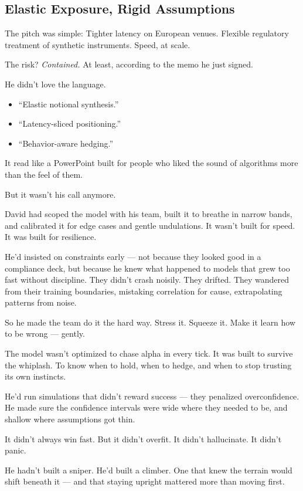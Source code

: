 
\subsection{Elastic Exposure, Rigid Assumptions}

The pitch was simple:
Tighter latency on European venues.
Flexible regulatory treatment of synthetic instruments.
Speed, at scale.

The risk?
\textit{Contained.} At least, according to the memo he just signed.

He didn’t love the language.

\begin{itemize}
    \item ``Elastic notional synthesis.'' 
    \item ``Latency-sliced positioning.'' 
    \item ``Behavior-aware hedging.''
\end{itemize}

It read like a PowerPoint built for people who liked the sound of algorithms more than the 
feel of them.

But it wasn’t his call anymore.

David had scoped the model with his team, built it to breathe in narrow bands, and calibrated it for edge 
cases and gentle undulations.
It wasn’t built for speed.
It was built for resilience.

He’d insisted on constraints early — not because they looked good in a compliance deck, but because 
he knew what happened to models that grew too fast without discipline. They didn’t crash noisily. 
They drifted. They wandered from their training boundaries, mistaking correlation for cause, 
extrapolating patterns from noise.

So he made the team do it the hard way.
Stress it. Squeeze it. Make it learn how to be wrong — gently.

The model wasn’t optimized to chase alpha in every tick.
It was built to survive the whiplash.
To know when to hold, when to hedge, and when to stop trusting its own instincts.

He’d run simulations that didn’t reward success — they penalized overconfidence.
He made sure the confidence intervals were wide where they needed to be, and shallow where assumptions 
got thin.

It didn’t always win fast.
But it didn’t overfit. It didn’t hallucinate. It didn’t panic.

He hadn’t built a sniper.
He’d built a climber. One that knew the terrain would shift beneath it — and that staying upright mattered 
more than moving first.

